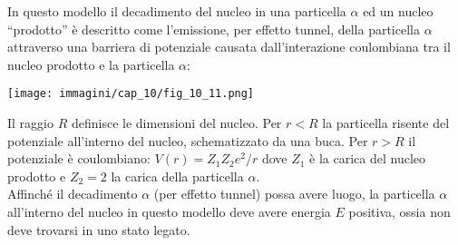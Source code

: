 \documentclass[a4paper,12pt,oneside]{book}
\begin{document}
In questo modello il decadimento del nucleo in una particella $\alpha$ ed un nucleo ``prodotto'' è descritto come l'emissione, per effetto tunnel, della particella $\alpha$ attraverso una barriera di potenziale causata dall'interazione coulombiana tra il nucleo prodotto e la particella $\alpha$:
\begin{center}
\texttt{[image: immagini/cap\_10/fig\_10\_11.png]}
\end{center}
Il raggio $R$ definisce le dimensioni del nucleo. Per $r<R$ la particella risente  del potenziale all'interno del nucleo, schematizzato da una buca. Per $r>R$ il potenziale è coulombiano: $V(r)=Z_1 Z_2 e^2/r$ dove $Z_1$ è la carica del nucleo prodotto e $Z_2=2$ la carica della particella $\alpha$.\\

Affinché il decadimento $\alpha$ (per effetto tunnel) possa avere luogo, la particella $\alpha$ all'interno del nucleo in questo modello deve avere energia $E$ positiva, ossia non deve trovarsi in uno stato legato.\\
\end{document}
